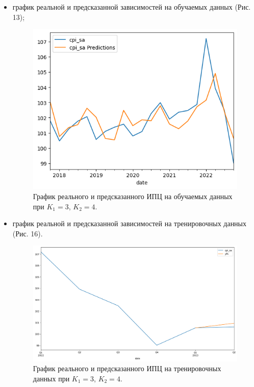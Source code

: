 \documentclass[a4paper, 14pt]{extarticle}
\begin{document}
\begin{enumerate}
\begin{itemize}
			\item график реальной и предсказанной зависимостей на обучаемых данных  (Рис. 13); 
				\begin{figure}[h!]
					\centering
					\includegraphics[scale=0.75]{images/pic_15}
					\caption[Рис. 15]{График реального и предсказанного ИПЦ на обучаемых данных при $K_1 = 3$, $K_2 = 4$.}
					\label{fig:pic15}
				\end{figure}
			
			\item график реальной и предсказанной зависимостей на тренировочных данных  (Рис. 16). 
				\begin{figure}[h!]
					\centering
					\includegraphics[scale=0.35]{images/pic_16}
					\caption[Рис. 16]{График реального и предсказанного ИПЦ на тренировочных данных при $K_1 = 3$, $K_2 = 4$.}
					\label{fig:pic16}
				\end{figure}
			
			\end{itemize}
		\end{enumerate}
			
\end{document}
